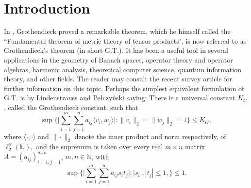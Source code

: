 \documentclass[a4paper,oneside,11pt, reqno]{amsart}
\numberwithin{equation}{section}
\theoremstyle{plain}
\begin{document}
\section{Introduction}
In \cite{Grothendieck}, Grothendieck proved a remarkable theorem, which he himself called the ``Fundamental theorem of metric theory of tensor products", is now referred to as Grothendieck's theorem (in short G.T.). It has been a useful tool in several applications in the geometry of Banach spaces, operator theory and operator algebras, harmonic analysis, theoretical computer science, quantum information theory, and other fields. The reader may consult the recent survey article \cite{Pisier} for further information on this topic. 
Perhaps the simplest equivalent formulation of G.T. is by Lindenstrauss and Pe\l{}czyński \cite{LinPel} saying: There is a universal constant $K_G$, called the Grothendieck constant, such that 
\begin{equation}\label{GI}
\sup\bigg\{\Big |\sum_{i=1}^m\sum_{j=1}^na_{ij}\langle v_i,w_j\rangle \Big|:\|v_i\|_2=\|w_j\|_2=1\bigg\}\leqslant K_G,
\end{equation}
where $\langle \cdot,\cdot \rangle$ and $\|\cdot\|_2$ denote the inner product and norm respectively, of $\ell^\mathbb R_2(\mathbb N),$ and the supremum is taken over every real $m\times n$ 
 matrix $A=(a_{ij})_{i=1,j=1}^{m,n}$, $m,n\in\mathbb N$,  with \[\sup\bigg\{\Big |\sum_{i=1}^m\sum_{j=1}^n a_{ij}s_i{t}_j \Big |:|s_i|,|t_j| \leq 1, \bigg\}\leqslant 1.\] 
\end{document}
